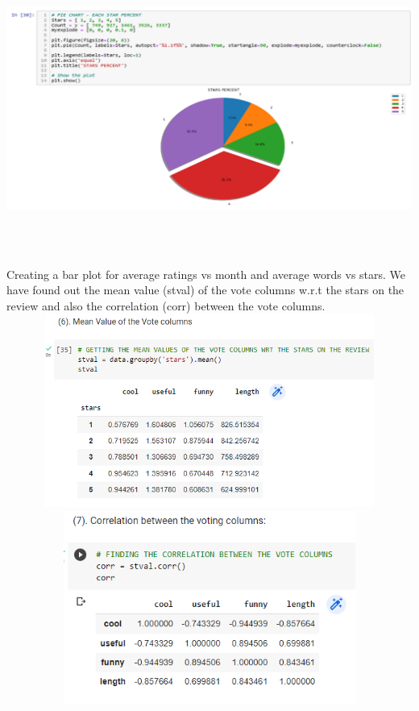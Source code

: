 \documentclass[a4paper, 12pt]{report}
\begin{document}
	\includegraphics[height=4in,width=6in]{7}\\
Creating a bar plot for average ratings vs month and average words vs stars. We have found out the mean value (stval) of the vote columns w.r.t the stars on the review and also the correlation (corr) between the vote columns.\\
	\includegraphics[height=2.5in,width=6in]{8}\\
	\includegraphics[height=2.5in,width=6in]{9}\\
\end{document}
